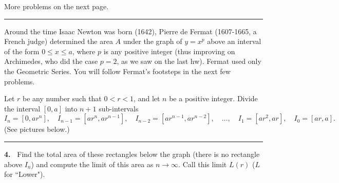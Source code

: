 \documentclass[12pt]{article}
\theoremstyle{definition}
\theoremstyle{remark}
\theoremstyle{definition}
\begin{document}
More problems on the next page. 
\newpage
\rule{\textwidth}{1pt}
Around the time Isaac Newton was born (1642), Pierre de Fermat (1607-1665, a French judge) determined the area $A$ under the graph of $y=x^p$ above an interval of the form $0\leq x\leq a$, where $p$ is any positive integer (thus improving on Archimedes, who did the case $p=2$, as we saw on the last hw).  Fermat used only the Geometric Series. You will follow Fermat's footsteps in the next few problems. 

Let $r$ be any number such that $0<r<1$, and let $n$ be a positive integer.   
Divide the interval $[0,a]$ into $n+1$ sub-intervals 
\[I_n=[0,ar^n],\quad I_{n-1}=[ar^n,ar^{n-1}],\quad I_{n-2}=[ar^{n-1}, ar^{n-2}],\quad \dots,\quad  I_1=[ar^2,ar],\quad I_0=[ar,a].\]
(See pictures below.)

\rule{\textwidth}{1pt}

{\bf 4.\ } Find the total area of these rectangles below the graph (there is no rectangle above $I_n$) and compute the limit of this area as $n\to\infty$.  Call this limit $L(r)$ ($L$ for ``Lower"). 
\end{document}
